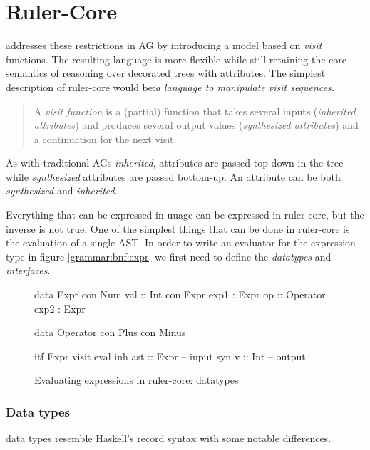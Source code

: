 \section{Ruler-Core}
\Rcore addresses these restrictions in AG by introducing a model based on \emph{visit}\cite{visits} functions. The resulting language is more flexible while still retaining the core semantics of reasoning over decorated trees with attributes. The simplest description of ruler-core would be:\emph{a language to manipulate visit sequences.}

\begin{quotation}
A \emph{visit function}\cite{visitag} is a (partial) function that takes several inputs (\emph{inherited attributes}) and produces several output values (\emph{synthesized attributes}) and a continuation for the next visit.
\end{quotation}

As with traditional AGs \emph{inherited}, attributes are passed top-down in the tree while \emph{synthesized} attributes are passed bottom-up. An attribute can be both \emph{synthesized} and \emph{inherited}.

Everything that can be expressed in uuagc can be expressed in ruler-core, but the inverse is not true. One of the simplest things that can be done in ruler-core is the evaluation of a single AST. In order to write an evaluator for the expression type in figure \ref{grammar:bnf:expr} we first need to define the \emph{datatypes} and \emph{interfaces}.

\begin{figure}[H]
\begin{minipage}[t]{0.4\linewidth}
\begin{code}
data Expr
  con Num
    val     :: Int
  con Expr
    exp1    :  Expr
    op      :: Operator
    exp2    :  Expr
\end{code}
\end{minipage}
\begin{minipage}[t]{0.6\linewidth}
\begin{code}
data Operator
  con Plus
  con Minus

itf Expr
  visit eval
    inh ast  :: Expr -- input
    syn v    :: Int  -- output
\end{code}
\end{minipage}
\caption{Evaluating expressions in ruler-core: datatypes}
\label{example:tutorial1:datatypes}
\end{figure}

\subsubsection{Data types}
\Rcore data types resemble Haskell's record syntax with some notable differences.

